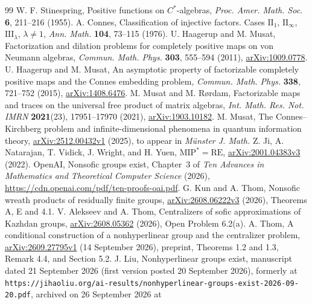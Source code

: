 \begin{thebibliography}{99}
W. F. Stinespring, Positive functions on $C^*$-algebras,
\emph{Proc. Amer. Math. Soc.} \textbf{6}, 211--216 (1955).
A. Connes, Classification of injective factors. Cases $\mathrm{II}_1$, $\mathrm{II}_\infty$,
$\mathrm{III}_\lambda$, $\lambda\ne1$,
\emph{Ann. Math.} \textbf{104}, 73--115 (1976).
U. Haagerup and M. Musat, Factorization and dilation problems for completely positive maps
on von Neumann algebras, \emph{Commun. Math. Phys.} \textbf{303}, 555--594 (2011),
\href{https://arxiv.org/abs/1009.0778}{arXiv:1009.0778}.
U. Haagerup and M. Musat, An asymptotic property of factorizable completely positive maps
and the Connes embedding problem, \emph{Commun. Math. Phys.} \textbf{338}, 721--752 (2015),
\href{https://arxiv.org/abs/1408.6476}{arXiv:1408.6476}.
M. Musat and M. R\o rdam, Factorizable maps and traces on the universal free product of
matrix algebras, \emph{Int. Math. Res. Not. IMRN} \textbf{2021}(23), 17951--17970 (2021),
\href{https://arxiv.org/abs/1903.10182}{arXiv:1903.10182}.
M. Musat, The Connes--Kirchberg problem and infinite-dimensional phenomena in quantum
information theory, \href{https://arxiv.org/abs/2512.00432v1}{arXiv:2512.00432v1} (2025), to appear in
\emph{M\"unster J. Math.}
Z. Ji, A. Natarajan, T. Vidick, J. Wright, and H. Yuen,
$\mathrm{MIP}^*=\mathrm{RE}$, \href{https://arxiv.org/abs/2001.04383v3}{arXiv:2001.04383v3} (2022).
OpenAI, Nonsofic groups exist, Chapter~3 of \emph{Ten Advances in Mathematics and Theoretical
Computer Science} (2026), \url{https://cdn.openai.com/pdf/ten-proofs-oai.pdf}.
G. Kun and A. Thom, Nonsofic wreath products of residually finite groups,
\href{https://arxiv.org/abs/2608.06222v3}{arXiv:2608.06222v3} (2026), Theorems A, E and 4.1.
V. Alekseev and A. Thom, Centralizers of sofic approximations of Kazhdan groups,
\href{https://arxiv.org/abs/2608.05362}{arXiv:2608.05362} (2026), Open Problem 6.2(a).
A. Thom, A conditional construction of a nonhyperlinear group and the centralizer problem,
\href{https://arxiv.org/abs/2609.27795v1}{arXiv:2609.27795v1} (14 September 2026), preprint,
Theorems 1.2 and 1.3, Remark 4.4, and Section 5.2.
J. Liu, Nonhyperlinear groups exist, manuscript dated 21 September 2026 (first version posted
20 September 2026), formerly at
\nolinkurl{https://jihaoliu.org/ai-results/nonhyperlinear-groups-exist-2026-09-20.pdf}, archived on
26 September 2026 at

\end{thebibliography}
